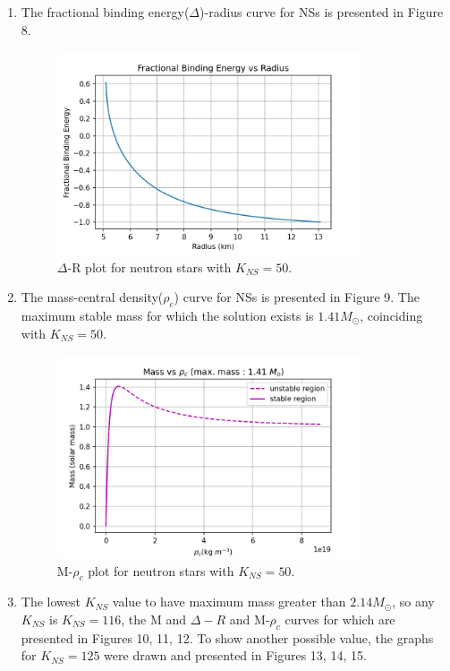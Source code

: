 \documentclass[a4paper]{article}
\begin{document}
\begin{enumerate}[label=(\alph*)]
\begin{enumerate}[label=(\alph*)]
        \item The fractional binding energy($\Delta$)-radius curve for NSs is presented in Figure 8.
        
        \begin{figure}[H] 
        \centering
        \includegraphics[width=0.85\textwidth]{NS_FBE_50.jpg}
        \caption{$\Delta$-R plot for neutron stars with $K_{NS} = 50$.}
        \end{figure}         
        
        \item The mass-central density($\rho_{c}$) curve for NSs is presented in Figure 9. The maximum stable mass for which the solution exists is $1.41M_{\odot}$, coinciding with $K_{NS} = 50$.
        
        \begin{figure}[H] 
        \centering
        \includegraphics[width=0.85\textwidth]{NS_rho_50.jpg}
        \caption{M-$\rho_{c}$ plot for neutron stars with $K_{NS} = 50$.}
        \end{figure} 
        
        \item The lowest $K_{NS}$ value to have maximum mass greater than $2.14M_{\odot}$, so any $K_{NS}$ is $K_{NS} = 116$, the M and $\Delta-R$ and M-$\rho_{c}$ curves for which are presented in Figures 10, 11, 12. To show another possible value, the graphs for $K_{NS} = 125$ were drawn and presented in Figures 13, 14, 15.
        

\end{enumerate}
\end{enumerate}
\end{document}
